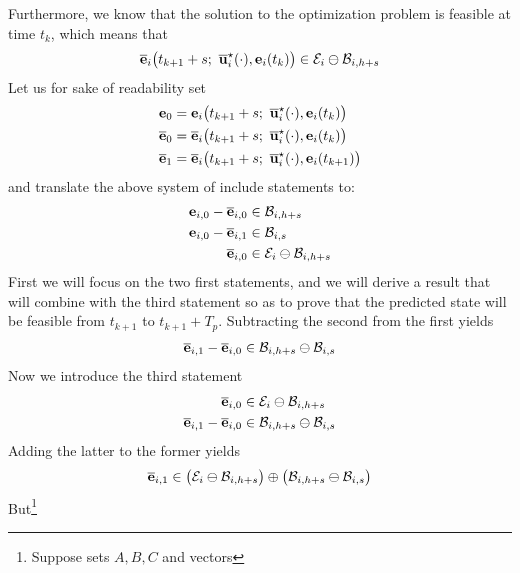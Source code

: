 \begin{gg_box}
Furthermore, we know that the solution to the optimization problem is
feasible at time $t_k$, which means that
\begin{align}
  \overline{\vect{e}}_i\big(t_{k+1} + s;\ \overline{\vect{u}}_i^{\star}(\cdot), \vect{e}_i(t_k)\big) \in \mathcal{E}_i \ominus \mathcal{B}_{i,h+s}
\end{align}
Let us for sake of readability set
\begin{align}
  \vect{e}_{0} &= \vect{e}_i\big(t_{k+1} + s;\ \overline{\vect{u}}_i^{\star}(\cdot), \vect{e}_i(t_k)\big) \\
  \overline{\vect{e}}_{0} &= \overline{\vect{e}}_i\big(t_{k+1} + s;\ \overline{\vect{u}}_i^{\star}(\cdot), \vect{e}_i(t_k)\big) \\
  \overline{\vect{e}}_{1} &= \overline{\vect{e}}_i\big(t_{k+1} + s;\ \overline{\vect{u}}_i^{\star}(\cdot), \vect{e}_i(t_{k+1})\big)
\end{align}
and translate the above system of include statements to:
\begin{align}
  \bm{\mathbf{e}}_{i,0} - \overline{\bm{\mathbf{e}}}_{i,0} &\in \mathcal{B}_{i, h+s} \\
  \bm{\mathbf{e}}_{i,0} - \overline{\bm{\mathbf{e}}}_{i,1} &\in \mathcal{B}_{i,s} \\
  \overline{\bm{\mathbf{e}}}_{i,0} &\in \mathcal{E}_i \ominus \mathcal{B}_{i,h+s}
\end{align}
First we will focus on the two first statements, and we will derive a result
that will combine with the third statement so as to prove that the predicted
state will be feasible from $t_{k+1}$ to $t_{k+1} + T_p$. Subtracting the
second from the first yields
\begin{align}
  \overline{\bm{\mathbf{e}}}_{i,1} - \overline{\bm{\mathbf{e}}}_{i,0} \in \mathcal{B}_{i, h+s} \ominus \mathcal{B}_{i,s}
\end{align}
Now we introduce the third statement
\begin{align}
  \overline{\bm{\mathbf{e}}}_{i,0} &\in \mathcal{E}_i \ominus \mathcal{B}_{i,h+s} \\
  \overline{\bm{\mathbf{e}}}_{i,1}- \overline{\bm{\mathbf{e}}}_{i,0} &\in \mathcal{B}_{i, h+s} \ominus \mathcal{B}_{i,s}
\end{align}
Adding the latter to the former yields
\begin{align}
  \overline{\bm{\mathbf{e}}}_{i,1} \in \big(\mathcal{E}_i \ominus \mathcal{B}_{i,h+s}\big) \oplus \big(\mathcal{B}_{i, h+s} \ominus \mathcal{B}_{i,s}\big)
\end{align}
But\footnote{
  Suppose sets $A,B,C$ and vectors
}
\end{gg_box}
